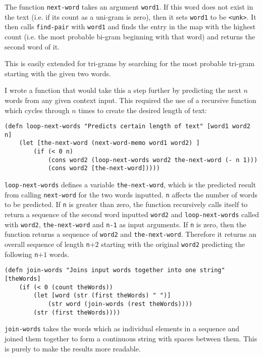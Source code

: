 The function \lstinline!next-word! takes an argument \lstinline!word1!. If this word does not exist in the text (i.e. if its count as a uni-gram is zero), then it sets \lstinline!word1! to be \lstinline!<unk>!. It then calls \lstinline!find-pair! with \lstinline!word1! and finds the entry in the map with the highest count (i.e. the most probable bi-gram beginning with that word) and returns the second word of it.

This is easily extended for tri-grams by searching for the most probable tri-gram starting with the given two words.

I wrote a function that would take this a step further by predicting the next $n$ words from any given context input. This required the use of a recursive function which cycles through $n$ times to create the desired length of text:

\begin{lstlisting}
(defn loop-next-words "Predicts certain length of text" [word1 word2 n] 
	(let [the-next-word (next-word-memo word1 word2) ]
		(if (< 0 n)  
			(cons word2 (loop-next-words word2 the-next-word (- n 1))) 
			(cons word2 [the-next-word])))) 
\end{lstlisting}

\lstinline!loop-next-words! defines a variable \lstinline!the-next-word!, which is the predicted result from calling \lstinline!next-word! for the two words inputted. \lstinline!n! affects the number of words to be predicted. If \lstinline!n! is greater than zero, the function recursively calls itself to return a sequence of the second word inputted \lstinline!word2! and \lstinline!loop-next-words! called with \lstinline!word2!, \lstinline!the-next-word! and \lstinline!n-1! as input arguments. If \lstinline!n! is zero, then the function returns a sequence of \lstinline!word2! and \lstinline!the-next-word!. Therefore it returns an overall sequence of length \lstinline!n!$+2$ starting with the original \lstinline!word2! predicting the following \lstinline!n!$+1$ words.

\begin{lstlisting}
(defn join-words "Joins input words together into one string" [theWords] 
	(if (< 0 (count theWords)) 
		(let [word (str (first theWords) " ")] 
			(str word (join-words (rest theWords)))) 
		(str (first theWords))))
\end{lstlisting}

\lstinline!join-words! takes the words which as individual elements in a sequence and joined them together to form a continuous string with spaces between them. This is purely to make the results more readable.

